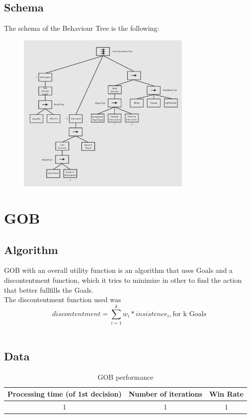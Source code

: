 \documentclass{article}
\begin{document}
  \subsection{Schema}
  The schema of the Behaviour Tree is the following:
  \begin{figure}[h]
    \centering
    \includegraphics[width=0.75\textwidth ]{Schema.jpg}
  \end{figure}
  \section{GOB}
  \subsection{Algorithm}
  GOB with an overall utility function is an algorithm that uses Goals and a discontentment function, which it tries to minimize in other to find the action that better fullfills the Goals. \\
  The discontentment function used was \[discontentment = \sum_{i=1}^{k}w_i * insistence_i, \text{for k Goals}\]\\ 
  \subsection{Data}
  \begin{table}[h!]
    \centering
    \caption{GOB performance}
    \label{tab:tableGOB1}
    \begin{tabular}{c|c|c}
      \textbf{Processing time (of 1st decision)} & \textbf{Number of iterations} & \textbf{Win Rate}\\
      \hline
      1 & 1 & 1
    \end{tabular}
  \end{table}
\end{document}
